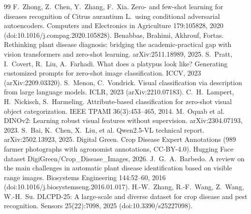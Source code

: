 \documentclass[11pt]{article}
\begin{document}
\begin{thebibliography}{99}
 F.~Zhong, Z.~Chen, Y.~Zhang, F.~Xia. Zero- and few-shot learning for diseases recognition of Citrus aurantium L.\ using conditional adversarial autoencoders. Computers and Electronics in Agriculture 179:105828, 2020 (doi:10.1016/j.compag.2020.105828).
 Benabbas, Brahimi, Akhrouf, Fortas. Rethinking plant disease diagnosis: bridging the academic-practical gap with vision transformers and zero-shot learning. arXiv:2511.18989, 2025.
 S.~Pratt, I.~Covert, R.~Liu, A.~Farhadi. What does a platypus look like? Generating customized prompts for zero-shot image classification. ICCV, 2023 (arXiv:2209.03320).
 S.~Menon, C.~Vondrick. Visual classification via description from large language models. ICLR, 2023 (arXiv:2210.07183).
 C.~H.~Lampert, H.~Nickisch, S.~Harmeling. Attribute-based classification for zero-shot visual object categorization. IEEE TPAMI 36(3):453--465, 2014.
 M.~Oquab et al. DINOv2: Learning robust visual features without supervision. arXiv:2304.07193, 2023.
 S.~Bai, K.~Chen, X.~Liu, et al. Qwen2.5-VL technical report. arXiv:2502.13923, 2025.
 Digital Green. Crop Disease Expert Annotations (989 farmer photographs with agronomist annotations, CC-BY-4.0). Hugging Face dataset DigiGreen/Crop\_Disease\_Images, 2026.
 J.~G.~A.~Barbedo. A review on the main challenges in automatic plant disease identification based on visible range images. Biosystems Engineering 144:52--60, 2016 (doi:10.1016/j.biosystemseng.2016.01.017).
 H.-W.~Zhang, R.-F.~Wang, Z.~Wang, W.-H.~Su. DLCPD-25: A large-scale and diverse dataset for crop disease and pest recognition. Sensors 25(22):7098, 2025 (doi:10.3390/s25227098).
\end{thebibliography}
\end{document}
